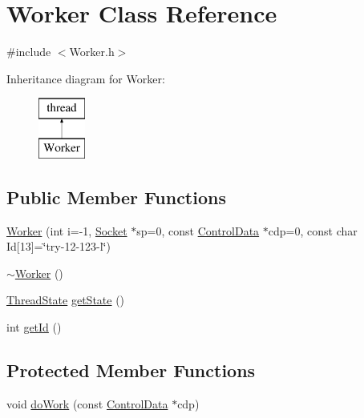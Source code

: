\hypertarget{classWorker}{}\section{Worker Class Reference}
\label{classWorker}


{\ttfamily \#include $<$Worker.\+h$>$}

Inheritance diagram for Worker\+:\begin{figure}[H]
\begin{center}
\leavevmode
\includegraphics[height=2.000000cm]{classWorker}
\end{center}
\end{figure}
\subsection*{Public Member Functions}
\begin{DoxyCompactItemize}
\item 
\hyperlink{classWorker_ac26eb9ca6a086b77ad902a78de87f251}{Worker} (int i=-\/1, \hyperlink{classSocket}{Socket} $\ast$sp=0, const \hyperlink{structControlData}{Control\+Data} $\ast$cdp=0, const char Id\mbox{[}13\mbox{]}=\char`\"{}try-\/12-\/123-\/l\char`\"{})
\item 
\hyperlink{classWorker_aa8e4543ef1e93fd9d884269ba30c5bfe}{$\sim$\+Worker} ()
\item 
\hyperlink{Worker_8h_ab3804a8a4369184ad46dadf8e54957b6}{Thread\+State} \hyperlink{classWorker_a2ababbc935eb10458640d2441f5e0c95}{get\+State} ()
\item 
int \hyperlink{classWorker_ac4629e67476bbb1daab8ed28545b8421}{get\+Id} ()
\end{DoxyCompactItemize}
\subsection*{Protected Member Functions}
\begin{DoxyCompactItemize}
\item 
void \hyperlink{classWorker_aeeb8e21ecb6687c34db1ad301028e41b}{do\+Work} (const \hyperlink{structControlData}{Control\+Data} $\ast$cdp)
\end{DoxyCompactItemize}

